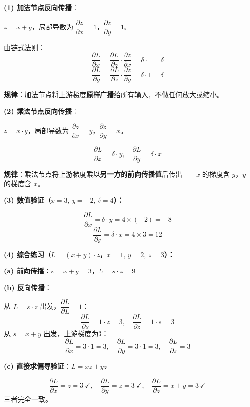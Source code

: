 \documentclass[a4paper,11pt]{ctexart}
\begin{document}
\begin{solutionbox}[参考答案与详细解析]
    \textbf{(1) 加法节点反向传播：}

    $z = x + y$，局部导数为 $\dfrac{\partial z}{\partial x} = 1$，$\dfrac{\partial z}{\partial y} = 1$。

    由链式法则：
    \[
    \frac{\partial L}{\partial x} = \frac{\partial L}{\partial z} \cdot \frac{\partial z}{\partial x} = \delta \cdot 1 = \delta
    \]
    \[
    \frac{\partial L}{\partial y} = \frac{\partial L}{\partial z} \cdot \frac{\partial z}{\partial y} = \delta \cdot 1 = \delta
    \]

    \textbf{规律}：加法节点将上游梯度\textbf{原样广播}给所有输入，不做任何放大或缩小。

    \textbf{(2) 乘法节点反向传播：}

    $z = x \cdot y$，局部导数为 $\dfrac{\partial z}{\partial x} = y$，$\dfrac{\partial z}{\partial y} = x$。

    \[
    \frac{\partial L}{\partial x} = \delta \cdot y, \quad \frac{\partial L}{\partial y} = \delta \cdot x
    \]

    \textbf{规律}：乘法节点将上游梯度乘以\textbf{另一方的前向传播值}后传出——$x$ 的梯度含 $y$，$y$ 的梯度含 $x$。

    \textbf{(3) 数值验证（$x=3,\ y=-2,\ \delta=4$）：}

    \[
    \frac{\partial L}{\partial x} = \delta \cdot y = 4 \times (-2) = \boxed{-8}
    \]
    \[
    \frac{\partial L}{\partial y} = \delta \cdot x = 4 \times 3 = \boxed{12}
    \]

    \textbf{(4) 综合练习（$L=(x+y)\cdot z$，$x=1,\ y=2,\ z=3$）：}

    \textbf{(a) 前向传播}：$s = x + y = 3$，$L = s \cdot z = 9$

    \textbf{(b) 反向传播}：

    从 $L = s \cdot z$ 出发，$\dfrac{\partial L}{\partial L}=1$：
    \[
    \frac{\partial L}{\partial s} = 1 \cdot z = 3, \quad \frac{\partial L}{\partial z} = 1 \cdot s = 3
    \]
    从 $s = x + y$ 出发，上游梯度为3：
    \[
    \frac{\partial L}{\partial x} = 3 \cdot 1 = \boxed{3}, \quad \frac{\partial L}{\partial y} = 3 \cdot 1 = \boxed{3}, \quad \frac{\partial L}{\partial z} = \boxed{3}
    \]

    \textbf{(c) 直接求偏导验证}：$L = xz + yz$

    \[
    \frac{\partial L}{\partial x} = z = 3\ \checkmark, \quad \frac{\partial L}{\partial y} = z = 3\ \checkmark, \quad \frac{\partial L}{\partial z} = x + y = 3\ \checkmark
    \]
    三者完全一致。
\end{solutionbox}
\end{document}
